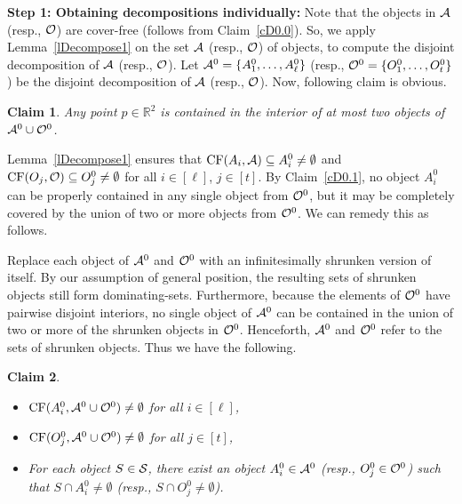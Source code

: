 \documentclass[a4paper,11pt]{article}
\newcommand{\IR}{\mathbb{R}}
\DeclareMathOperator{\CF}{CF}
\newtheorem{claim}{Claim}
\begin{document}
{\bf Step 1: Obtaining  decompositions individually:} 
Note that the objects in ${\cal A}$ (resp., ${\cal 
O}$) are cover-free (follows from Claim~\ref{cD0.0}). So, we  apply  Lemma~\ref{lDecompose1} on the set ${\cal A}$ (resp., ${\cal 
O}$) of
objects, to compute 
the disjoint decomposition of ${\cal A}$ (resp., ${\cal {O}}$).
Let ${\cal A}^0=\{A^0_{1}, \ldots, 
A^0_{\ell}\}$ (resp., ${\cal O}^0=\{O_{1}^0, \ldots, 
O_{t}^0\}$ ) be the  disjoint decomposition of 
${\cal A}$ (resp., ${\cal {O}}$). Now, following claim is obvious.

\begin{claim}\label{cD0}
Any point $p\in \IR^2$ is contained in the interior of  at most two objects 
of  ${\cal 
A}^0\cup {\cal O}^0$.
\end{claim}

Lemma~\ref{lDecompose1} ensures that   $\CF({A_i},{\cal A})\subseteq A^0_i \neq \emptyset$ and
 $\CF({O_j},{\cal O})\subseteq O^0_j\neq \emptyset$ for all $i\in [\ell]$, $j\in[t]$.  
By Claim~\ref{cD0.1}, no object $A^0_i$ can be properly contained in any single object from ${\cal O}^0$, but it may be completely covered by the union of  two or more objects from ${\cal O}^0$. We can remedy this as follows.

Replace each object of ${\cal A}^0$ and ${\cal O}^0$ with an infinitesimally shrunken version of itself. By our assumption of general position, the resulting sets of shrunken objects still form dominating-sets. Furthermore, because the elements of ${\cal O}^0$ have pairwise disjoint interiors, no single object of ${\cal A}^0$ can be contained in the union of two or more of the shrunken objects in ${\cal O}^0$. Henceforth, ${\cal A}^0$ and ${\cal O}^0$ refer to the sets of shrunken objects. Thus we have the following.

\begin{claim}\label{cD0.3}
\begin{itemize}
\item[(i)] $\CF(A^0_i, {\cal A}^0\cup {\cal O}^0)\neq \emptyset$ for all $i\in[\ell]$,
\item[(ii)] $\CF(O^0_j, {\cal A}^0\cup {\cal O}^0)\neq \emptyset$ for all $j\in[t]$,

\item[(iii)] For each object $S\in {\cal S}$, there exist an  object  $A_i^0\in{\cal A}^0$ (resp., $O_j^0\in{\cal O}^0$)
such that $S\cap A_i^0 \neq \emptyset$ (resp., $S\cap O_j^0\neq \emptyset$).
\end{itemize}
\end{claim}
\end{document}
